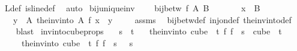 \begin{isabellebody}
\ L{\isacharunderscore}{\kern0pt}def\ is{\isacharunderscore}{\kern0pt}line{\isacharunderscore}{\kern0pt}def\ \isamarkupfalse%
\ auto\isanewline
{}\isamarkupfalse%
%
\endisatagproof
{\isafoldproof}%
%
\isadelimproof
\isanewline
%
\endisadelimproof
\isanewline
{}\isamarkupfalse%
\ bij{\isacharunderscore}{\kern0pt}unique{\isacharunderscore}{\kern0pt}inv{\isacharcolon}{\kern0pt}\ \isanewline
\ \ \ {\isachardoublequoteopen}bij{\isacharunderscore}{\kern0pt}betw\ f\ A\ B{\isachardoublequoteclose}\ \ \isanewline
\ \ \ \ \ {\isachardoublequoteopen}x\ {\isasymin}\ B{\isachardoublequoteclose}\isanewline
\ \ \ {\isachardoublequoteopen}{\isasymexists}{\isacharbang}{\kern0pt}y\ {\isasymin}\ A{\isachardot}{\kern0pt}\ {\isacharparenleft}{\kern0pt}the{\isacharunderscore}{\kern0pt}inv{\isacharunderscore}{\kern0pt}into\ A\ f{\isacharparenright}{\kern0pt}\ x\ {\isacharequal}{\kern0pt}\ y{\isachardoublequoteclose}\ \isanewline
%
\isadelimproof
\ \ %
\endisadelimproof
%
\isatagproof
{}\isamarkupfalse%
\ assms\ \isamarkupfalse%
\ bij{\isacharunderscore}{\kern0pt}betw{\isacharunderscore}{\kern0pt}def\ inj{\isacharunderscore}{\kern0pt}on{\isacharunderscore}{\kern0pt}def\ the{\isacharunderscore}{\kern0pt}inv{\isacharunderscore}{\kern0pt}into{\isacharunderscore}{\kern0pt}def\ \isanewline
\ \ \isamarkupfalse%
\ blast%
\endisatagproof
{\isafoldproof}%
%
\isadelimproof
\isanewline
%
\endisadelimproof
\isanewline
{}\isamarkupfalse%
\ inv{\isacharunderscore}{\kern0pt}into{\isacharunderscore}{\kern0pt}cube{\isacharunderscore}{\kern0pt}props{\isacharcolon}{\kern0pt}\isanewline
\ \ \ {\isachardoublequoteopen}s\ {\isacharless}{\kern0pt}\ t{\isachardoublequoteclose}\isanewline
\ \ \ {\isachardoublequoteopen}the{\isacharunderscore}{\kern0pt}inv{\isacharunderscore}{\kern0pt}into\ {\isacharparenleft}{\kern0pt}cube\ {}\ t{\isacharparenright}{\kern0pt}\ {\isacharparenleft}{\kern0pt}{\isasymlambda}f{\isachardot}{\kern0pt}\ f\ {}{\isacharparenright}{\kern0pt}\ s\ {\isasymin}\ cube\ {}\ t{\isachardoublequoteclose}\ \isanewline
\ \ \ \ \ {\isachardoublequoteopen}the{\isacharunderscore}{\kern0pt}inv{\isacharunderscore}{\kern0pt}into\ {\isacharparenleft}{\kern0pt}cube\ {}\ t{\isacharparenright}{\kern0pt}\ {\isacharparenleft}{\kern0pt}{\isasymlambda}f{\isachardot}{\kern0pt}\ f\ {}{\isacharparenright}{\kern0pt}\ s\ {}\ {\isacharequal}{\kern0pt}\ s{\isachardoublequoteclose}\isanewline

\end{isabellebody}
